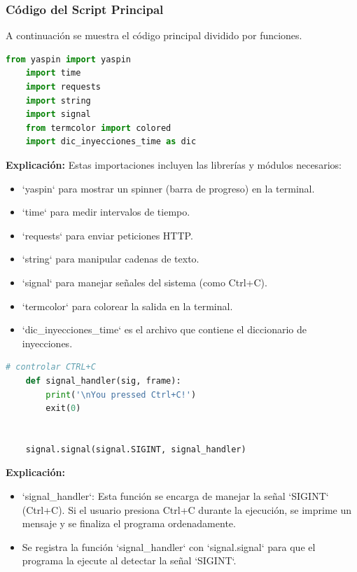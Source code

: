 \documentclass[a4paper,12pt]{article}
\begin{document}
\subsubsection{Código del Script Principal}

A continuación se muestra el código principal dividido por funciones.

\begin{lstlisting}[language=Python]
    from yaspin import yaspin
    import time
    import requests
    import string
    import signal
    from termcolor import colored
    import dic_inyecciones_time as dic
\end{lstlisting}

\textbf{Explicación:}  
Estas importaciones incluyen las librerías y módulos necesarios:  
\begin{itemize}
\item `yaspin` para mostrar un spinner (barra de progreso) en la terminal.  
\item `time` para medir intervalos de tiempo.  
\item `requests` para enviar peticiones HTTP.  
\item `string` para manipular cadenas de texto.  
\item `signal` para manejar señales del sistema (como Ctrl+C).  
\item `termcolor` para colorear la salida en la terminal.  
\item `dic\_inyecciones\_time` es el archivo que contiene el diccionario de inyecciones.
\end{itemize}


\begin{lstlisting}[language=Python]
    # controlar CTRL+C
    def signal_handler(sig, frame):
        print('\nYou pressed Ctrl+C!')
        exit(0)


    signal.signal(signal.SIGINT, signal_handler)
\end{lstlisting}

\textbf{Explicación:}  
\begin{itemize}
\item `signal\_handler`: Esta función se encarga de manejar la señal `SIGINT` (Ctrl+C). Si el usuario presiona Ctrl+C durante la ejecución, se imprime un mensaje y se finaliza el programa ordenadamente.
\item Se registra la función `signal\_handler` con `signal.signal` para que el programa la ejecute al detectar la señal `SIGINT`.
\end{itemize}
\end{document}
